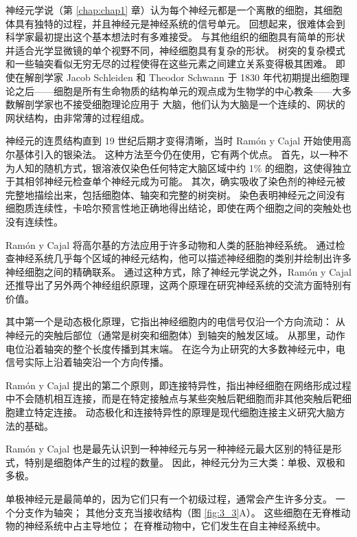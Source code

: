神经元学说（第 \ref{chap:chap1} 章）认为每个神经元都是一个离散的细胞，其细胞体具有独特的过程，并且神经元是神经系统的信号单元。 
回想起来，很难体会到科学家最初提出这个基本想法时有多难接受。 
与其他组织的细胞具有简单的形状并适合光学显微镜的单个视野不同，神经细胞具有复杂的形状。 
树突的复杂模式和一些轴突看似无穷无尽的过程使得在这些元素之间建立关系变得极其困难。 
即使在解剖学家 Jacob Schleiden 和 Theodor Schwann 于 1830 年代初期提出细胞理论之后——细胞是所有生命物质的结构单元的观点成为生物学的中心教条——大多数解剖学家也不接受细胞理论应用于 大脑，他们认为大脑是一个连续的、网状的网状结构，由非常薄的过程组成。


神经元的连贯结构直到 19 世纪后期才变得清晰，当时 Ramón y Cajal 开始使用高尔基体引入的银染法。 
这种方法至今仍在使用，它有两个优点。 
首先，以一种不为人知的随机方式，银溶液仅染色任何特定大脑区域中约 1\% 的细胞，这使得独立于其相邻神经元检查单个神经元成为可能。 
其次，确实吸收了染色剂的神经元被完整地描绘出来，包括细胞体、轴突和完整的树突树。 
染色表明神经元之间没有细胞质连续性，卡哈尔预言性地正确地得出结论，即使在两个细胞之间的突触处也没有连续性。


Ramón y Cajal 将高尔基的方法应用于许多动物和人类的胚胎神经系统。 
通过检查神经系统几乎每个区域的神经元结构，他可以描述神经细胞的类别并绘制出许多神经细胞之间的精确联系。 
通过这种方式，除了神经元学说之外，Ramón y Cajal 还推导出了另外两个神经组织原理，这两个原理在研究神经系统的交流方面特别有价值。


其中第一个是动态极化原理，它指出神经细胞内的电信号仅沿一个方向流动：
从神经元的突触后部位（通常是树突和细胞体）到轴突的触发区域。 
从那里，动作电位沿着轴突的整个长度传播到其末端。 
在迄今为止研究的大多数神经元中，电信号实际上沿着轴突沿一个方向传播。


Ramón y Cajal 提出的第二个原则，即连接特异性，指出神经细胞在网络形成过程中不会随机相互连接，而是在特定接触点与某些突触后靶细胞而非其他突触后靶细胞建立特定连接。 
动态极化和连接特异性的原理是现代细胞连接主义研究大脑方法的基础。


Ramón y Cajal 也是最先认识到一种神经元与另一种神经元最大区别的特征是形式，特别是细胞体产生的过程的数量。 
因此，神经元分为三大类：单极、双极和多极。


单极神经元是最简单的，因为它们只有一个初级过程，通常会产生许多分支。 
一个分支作为轴突； 其他分支充当接收结构（图 \ref{fig:3_3}A）。 
这些细胞在无脊椎动物的神经系统中占主导地位； 
在脊椎动物中，它们发生在自主神经系统中。

